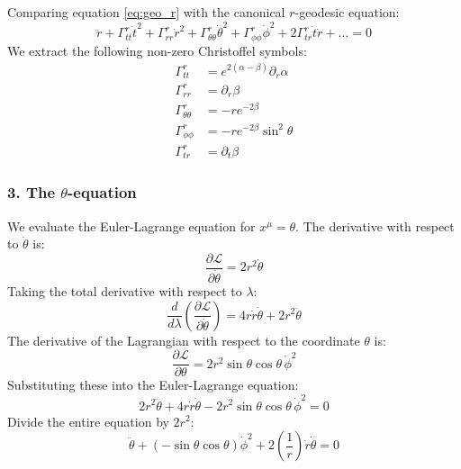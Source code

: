 \documentclass[11pt, a4paper]{report}
\begin{document}
Comparing equation \eqref{eq:geo_r} with the canonical $r$-geodesic equation:
\begin{equation}
    \ddot{r} + \Gamma^r_{tt}\dot{t}^2 + \Gamma^r_{rr}\dot{r}^2 + \Gamma^r_{\theta\theta}\dot{\theta}^2 + \Gamma^r_{\phi\phi}\dot{\phi}^2 + 2\Gamma^r_{tr}\dot{t}\dot{r} + \dots = 0
\end{equation}
We extract the following non-zero Christoffel symbols:
\begin{align}
    \Gamma^r_{tt} &= e^{2(\alpha - \beta)} \partial_r \alpha \\
    \Gamma^r_{rr} &= \partial_r \beta \\
    \Gamma^r_{\theta\theta} &= -r e^{-2\beta} \\
    \Gamma^r_{\phi\phi} &= -r e^{-2\beta} \sin^2\theta \\
    \Gamma^r_{tr} &= \partial_t \beta
\end{align}

\subsubsection*{3. The $\theta$-equation}

We evaluate the Euler-Lagrange equation for $x^\mu = \theta$.
The derivative with respect to $\dot{\theta}$ is:
\begin{equation}
    \frac{\partial \mathcal{L}}{\partial \dot{\theta}} = 2r^2 \dot{\theta}
\end{equation}
Taking the total derivative with respect to $\lambda$:
\begin{equation}
    \frac{d}{d\lambda} \left( \frac{\partial \mathcal{L}}{\partial \dot{\theta}} \right) = 4r\dot{r}\dot{\theta} + 2r^2 \ddot{\theta}
\end{equation}
The derivative of the Lagrangian with respect to the coordinate $\theta$ is:
\begin{equation}
    \frac{\partial \mathcal{L}}{\partial \theta} = 2r^2 \sin\theta \cos\theta \, \dot{\phi}^2
\end{equation}
Substituting these into the Euler-Lagrange equation:
\begin{equation}
    2r^2 \ddot{\theta} + 4r\dot{r}\dot{\theta} - 2r^2 \sin\theta \cos\theta \, \dot{\phi}^2 = 0
\end{equation}
Divide the entire equation by $2r^2$:
\begin{equation}
    \ddot{\theta} + (-\sin\theta \cos\theta) \dot{\phi}^2 + 2 \left(\frac{1}{r}\right) \dot{r}\dot{\theta} = 0 \label{eq:geo_theta}
\end{equation}
\end{document}
